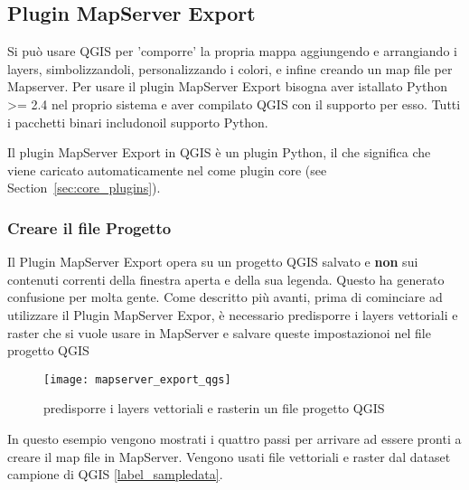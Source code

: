 
\subsection{Plugin MapServer Export}\label{sec:mapserver_export}


Si può usare QGIS per 'comporre' la propria mappa aggiungendo e arrangiando i layers, simbolizzandoli, personalizzando i colori, e infine creando un map file per Mapserver. Per usare il plugin MapServer Export bisogna aver istallato Python >= 2.4 nel proprio sistema e aver compilato QGIS con il supporto per esso. Tutti i pacchetti binari includonoil supporto Python.

Il plugin MapServer Export in QGIS \CURRENT è un plugin Python, il che significa che viene caricato automaticamente nel   come plugin core 
(see Section~\ref{sec:core_plugins}).

\subsubsection{Creare il file Progetto}

Il Plugin MapServer Export opera su un progetto QGIS salvato e 
\textbf{non} sui contenuti correnti della finestra aperta e della sua legenda. Questo ha generato confusione per molta gente.  Come descritto più avanti, prima di cominciare ad utilizzare il Plugin MapServer Expor, è necessario predisporre i layers vettoriali e raster che si vuole usare in MapServer e salvare queste impostazionoi nel file progetto QGIS

\begin{figure}[ht]
\begin{center}
  \caption{predisporre i layers vettoriali e rasterin un file progetto QGIS \nixcaption}
  \label{fig:mapserver_export_qgs}\smallskip
  \texttt{[image: mapserver\_export\_qgs]}
\end{center}
\end{figure}

In questo esempio vengono mostrati i quattro passi per arrivare ad essere pronti a creare il map file in MapServer. Vengono usati file vettoriali e raster dal dataset campione di QGIS \ref{label_sampledata}.

